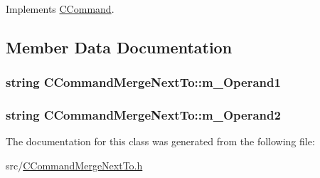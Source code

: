 Implements \hyperlink{classCCommand_ad9361ea814093c4ebecf22bb0a3f8b79}{C\+Command}.



\subsection{Member Data Documentation}
\subsubsection[{\texorpdfstring{m\+\_\+\+Operand1}{m_Operand1}}]{\setlength{\rightskip}{0pt plus 5cm}string C\+Command\+Merge\+Next\+To\+::m\+\_\+\+Operand1\hspace{0.3cm}{\ttfamily [private]}}\hypertarget{classCCommandMergeNextTo_ae967c718f405476f0a833994061af64f}{}\label{classCCommandMergeNextTo_ae967c718f405476f0a833994061af64f}
\subsubsection[{\texorpdfstring{m\+\_\+\+Operand2}{m_Operand2}}]{\setlength{\rightskip}{0pt plus 5cm}string C\+Command\+Merge\+Next\+To\+::m\+\_\+\+Operand2\hspace{0.3cm}{\ttfamily [private]}}\hypertarget{classCCommandMergeNextTo_a201710d63a46fee8603ee4b625e8e189}{}\label{classCCommandMergeNextTo_a201710d63a46fee8603ee4b625e8e189}


The documentation for this class was generated from the following file\+:\begin{DoxyCompactItemize}
\item 
src/\hyperlink{CCommandMergeNextTo_8h}{C\+Command\+Merge\+Next\+To.\+h}\end{DoxyCompactItemize}
